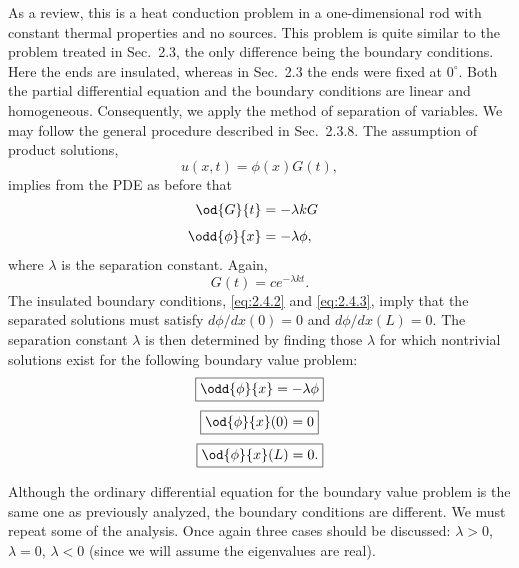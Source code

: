 As a review, this is a heat conduction problem in a one-dimensional rod with constant thermal properties and no sources. This problem is quite similar to the problem treated in Sec.~2.3, the only difference being the boundary conditions. Here the ends are insulated, whereas in Sec.~2.3 the ends were fixed at $0^\circ$. Both the partial differential equation and the boundary conditions are linear and homogeneous. Consequently, we apply the method of separation of variables. We may follow the general procedure described in Sec.~2.3.8. The assumption of product solutions,
\begin{equation}
\label{eq:2.4.5}
u(x,t) = \phi(x)G(t),
\end{equation}
implies from the PDE as before that
\begin{alignat}{2}
\od{G}{t} &= -\lambda kG & \label{eq:2.4.6} \\[4pt]
\odd{\phi}{x} &= -\lambda\phi, & \label{eq:2.4.7}
\end{alignat}
where $\lambda$ is the separation constant. Again,
\begin{equation}
\label{eq:2.4.8}
G(t) = ce^{-\lambda kt}.
\end{equation}
The insulated boundary conditions, \eqref{eq:2.4.2} and \eqref{eq:2.4.3}, imply that the separated solutions must satisfy $d\phi/dx(0) = 0$ and $d\phi/dx(L) = 0$. The separation constant $\lambda$ is then determined by finding those $\lambda$ for which nontrivial solutions exist for the following boundary value problem:
\begin{equation}
\label{eq:2.4.9}
\boxed{\odd{\phi}{x} = -\lambda\phi}
\end{equation}
\begin{equation}
\label{eq:2.4.10}
\boxed{\od{\phi}{x}(0) = 0}
\end{equation}
\begin{equation}
\label{eq:2.4.11}
\boxed{\od{\phi}{x}(L) = 0.}
\end{equation}

Although the ordinary differential equation for the boundary value problem is the same one as previously analyzed, the boundary conditions are different. We must repeat some of the analysis. Once again three cases should be discussed: $\lambda > 0$, $\lambda = 0$, $\lambda < 0$ (since we will assume the eigenvalues are real).

